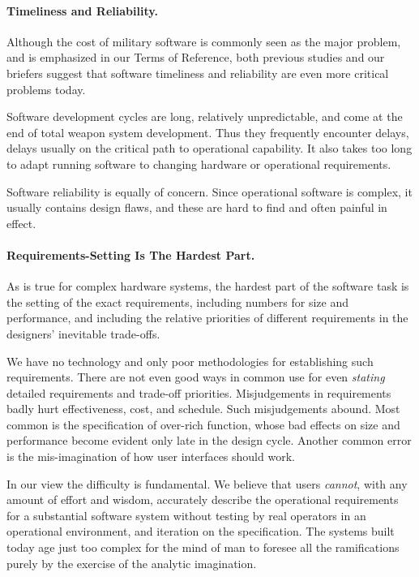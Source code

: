 \documentclass[12pt,final]{article}
\begin{document}
\paragraph{Timeliness and Reliability.} Although the cost of military software
is commonly seen as the major problem, and is emphasized in our Terms of
Reference, both previous studies and our briefers suggest that software
timeliness and reliability are even more critical problems today.

Software development cycles are long, relatively unpredictable, and come at the
end of total weapon system development. Thus they frequently encounter delays,
delays usually on the critical path to operational capability. It also takes
too long to adapt running software to changing hardware or operational
requirements.

Software reliability is equally of concern. Since operational software is
complex, it usually contains design flaws, and these are hard to find and often
painful in effect.

\paragraph{Requirements-Setting Is The Hardest Part.} As is true for complex
hardware systems, the hardest part of the software task is the setting of the
exact requirements, including numbers for size and performance, and including
the relative priorities of different requirements in the designers’ inevitable
trade-offs.

We have no technology and only poor methodologies for establishing such
requirements. There are not even good ways in common use for even
\emph{stating} detailed requirements and trade-off priorities. Misjudgements in
requirements badly hurt effectiveness, cost, and schedule. Such misjudgements
abound. Most common is the specification of over-rich function, whose bad
effects on size and performance become evident only late in the design cycle.
Another common error is the mis-imagination of how user interfaces should work.

In our view the difficulty is fundamental. We believe that users \emph{cannot},
with any amount of effort and wisdom, accurately describe the operational
requirements for a substantial software system without testing by real
operators in an operational environment, and iteration on the specification.
The systems built today age just too complex for the mind of man to foresee all
the ramifications purely by the exercise of the analytic imagination.
\end{document}
